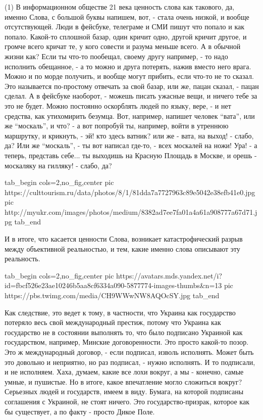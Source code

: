 (1) В информационном обществе 21 века ценность слова как такового, да, именно
Слова, с большой буквы напишем, вот, - стала очень низкой, и вообще
отсутствующей. Люди в фейсбуке, телеграме и СМИ пишут что попало и как попало.
Какой-то сплошной базар, один кричит одно, другой кричит другое, и громче всего
кричат те, у кого совести и разума меньше всего.  А в обычной жизни как? Если
ты что-то пообещал, своему другу например, - то надо исполнить обещанное, - а
то можно и друга потерять, нажив вместо него врага. Можно и по морде получить,
и вообще могут прибить, если что-то не то сказал. Это называется по-простому
отвечать за свой базар, или же, пацан сказал, - пацан сделал. А в фейсбуке
наоборот, - можешь писать ужасные вещи, и ничего тебе за это не будет. Можно
постоянно оскорблять людей по языку, вере, - и нет средства, как утихомирить
безумца. Вот, например, напишет человек \enquote{вата}, или же
\enquote{москаль}, и что? - а вот попробуй ты, например, войти в утреннюю
маршрутку, и крикнуть, - эй! кто здесь ватник?  или же - вата, на выход! -
слабо, да? Или же \enquote{москаль}, - ты вот написал где-то, - всех москалей
на ножи! Ура! - а теперь, представь себе... ты выходишь на Красную Площадь в
Москве, и орешь - москаляку на гилляку! - слабо, да?

\ifcmt
  tab_begin cols=2,no_fig,center
     pic https://culttourism.ru/data/photos/8/1/81dda7a7727963c89e5042e38efb41e0.jpg
     pic http://myukr.com/images/photos/medium/8382ad7ee7fa01a4a61a908777a67d71.jpg 
  tab_end
\fi

И в итоге, что касается ценности Слова, возникает катастрофический разрыв между
объективной реальностью, и тем, какие именно слова описывают эту реальность.

\ifcmt
  tab_begin cols=2,no_fig,center
     pic https://avatars.mds.yandex.net/i?id=fbcf526e23ae10246b5aa8cf6334a090-5877774-images-thumbs&n=13
     pic https://pbs.twimg.com/media/CH9WWwNW8AQOcSY.jpg
  tab_end
\fi

Как следствие, это ведет к тому, в частности, что Украина как государство
потеряло весь свой международный престиж, потому что Украина как государство не
в состоянии выполнять то, что было подписано Украиной как государством,
например, Минские договоренности. Это просто какой-то позор. Это ж
международный договор, - если подписал, изволь исполнять.  Может быть это
довольно и неприятно, но раз подписал, - нужно исполнять. И то подписали, и не
исполняем. Хаха, думаем, какие все лохи вокруг, а мы - конечно, самые умные, и
пушистые. Но в итоге, какое впечатление могло сложиться вокруг? Серьезных людей
и государств, имеем в виду. Бумага, на которой подписаны соглашения с Украиной,
не стоят ничего. Это государство-призрак, которое как бы существует, а по факту
- просто Дикое Поле.

